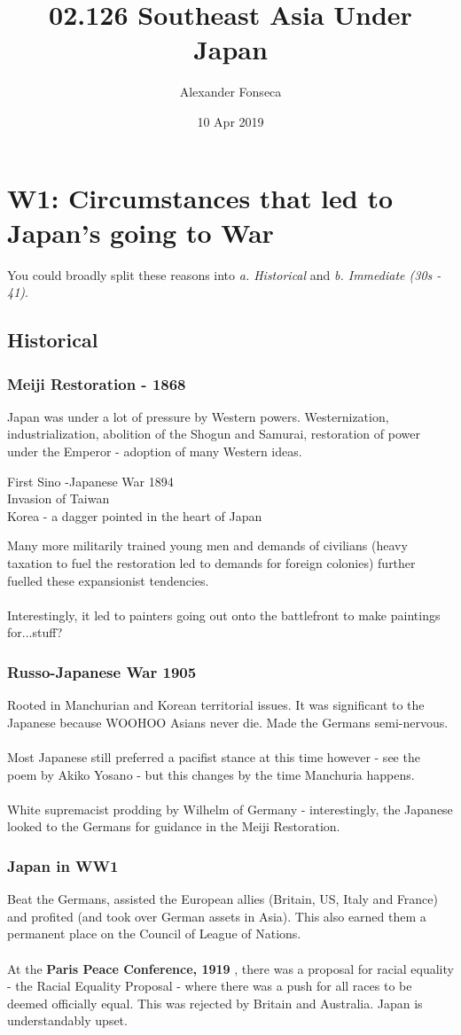 \documentclass[a4paper]{article}
\title{02.126 Southeast Asia Under Japan}
\author{Alexander Fonseca}
\date{10 Apr 2019}
\begin{document}
\maketitle
\tableofcontents
\newpage
\section{W1: Circumstances that led to Japan's going to War}
You could broadly split these reasons into \textit{a. Historical} and \textit{b. Immediate (30s - 41)}. 
\subsection{Historical}
\subsubsection{Meiji Restoration - 1868}
Japan was under a lot of pressure by Western powers. Westernization, industrialization, abolition of the Shogun and Samurai, restoration of power under the Emperor - adoption of many Western ideas.
\begin{displayquote}
	First Sino -Japanese War 1894\\
	Invasion of Taiwan\\
	Korea - a dagger pointed in the heart of Japan
\end{displayquote}
Many more militarily trained young men and demands of civilians (heavy taxation to fuel the restoration led to demands for foreign colonies) further fuelled these expansionist tendencies.\\
\\
Interestingly, it led to painters going out onto the battlefront to make paintings for...stuff?
\subsubsection{Russo-Japanese War 1905}
Rooted in Manchurian and Korean territorial issues. It was significant to the Japanese because WOOHOO Asians never die. Made the Germans semi-nervous.\\
\\
Most Japanese still preferred a pacifist stance at this time however - see the poem by Akiko Yosano - but this changes by the time Manchuria happens.\\
\\
White supremacist prodding by Wilhelm of Germany - interestingly, the Japanese looked to the Germans for guidance in the Meiji Restoration.
\subsubsection{Japan in WW1}
Beat the Germans, assisted the European allies (Britain, US, Italy and France) and profited (and took over German assets in Asia). This also earned them a permanent place on the Council of League of Nations.\\
\\
At the \textbf{Paris Peace Conference, 1919} , there was a proposal for racial equality - the Racial Equality Proposal - where there was a push for all races to be deemed officially equal. This was rejected by Britain and Australia. Japan is understandably upset.
\end{document}
